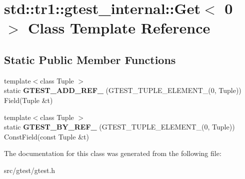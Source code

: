\hypertarget{classstd_1_1tr1_1_1gtest__internal_1_1_get_3_010_01_4}{}\section{std\+:\+:tr1\+:\+:gtest\+\_\+internal\+:\+:Get$<$ 0 $>$ Class Template Reference}
\label{classstd_1_1tr1_1_1gtest__internal_1_1_get_3_010_01_4}
\subsection*{Static Public Member Functions}
\begin{DoxyCompactItemize}
\item 
\mbox{\label{classstd_1_1tr1_1_1gtest__internal_1_1_get_3_010_01_4_a74beca3869fddfe42ee608b7f4cacb96}} 
{\footnotesize template$<$class Tuple $>$ }\\static {\bfseries G\+T\+E\+S\+T\+\_\+\+A\+D\+D\+\_\+\+R\+E\+F\+\_\+} (G\+T\+E\+S\+T\+\_\+\+T\+U\+P\+L\+E\+\_\+\+E\+L\+E\+M\+E\+N\+T\+\_\+(0, Tuple)) Field(Tuple \&t)
\item 
\mbox{\label{classstd_1_1tr1_1_1gtest__internal_1_1_get_3_010_01_4_a195b3853de45077f9a324c455f22d7e2}} 
{\footnotesize template$<$class Tuple $>$ }\\static {\bfseries G\+T\+E\+S\+T\+\_\+\+B\+Y\+\_\+\+R\+E\+F\+\_\+} (G\+T\+E\+S\+T\+\_\+\+T\+U\+P\+L\+E\+\_\+\+E\+L\+E\+M\+E\+N\+T\+\_\+(0, Tuple)) Const\+Field(const Tuple \&t)
\end{DoxyCompactItemize}


The documentation for this class was generated from the following file\+:\begin{DoxyCompactItemize}
\item 
src/gtest/gtest.\+h\end{DoxyCompactItemize}

